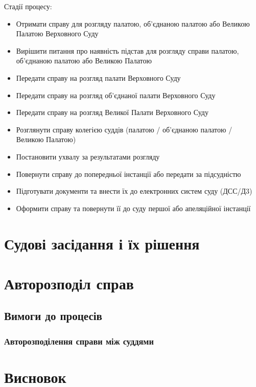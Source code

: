 \documentclass{article}
\begin{document}
Стадії процесу:

\begin{itemize}
    \item Отримати справу для розгляду палатою, об’єднаною палатою або Великою Палатою Верховного Суду
    \item Вирішити питання про наявність підстав для розгляду справи палатою, об’єднаною палатою або Великою Палатою
    \item Передати справу на розгляд палати Верховного Суду
    \item Передати справу на розгляд об’єднаної палати Верховного Суду
    \item Передати справу на розгляд Великої Палати Верховного Суду
    \item Розглянути справу колегією суддів (палатою / об’єднаною палатою / Великою Палатою)
    \item Постановити ухвалу за результатами розгляду
    \item Повернути справу до попередньої інстанції або передати за підсудністю
    \item Підготувати документи та внести їх до електронних систем суду (ДСС/Д3)
    \item Оформити справу та повернути її до суду першої або апеляційної інстанції
\end{itemize}

\newpage
\section{Судові засідання і їх рішення}

\newpage
\section{Авторозподіл справ}

\subsection{Вимоги до процесів}

\subsubsection{Авторозподілення справи між суддями}

\newpage
\section{Висновок}
\end{document}
